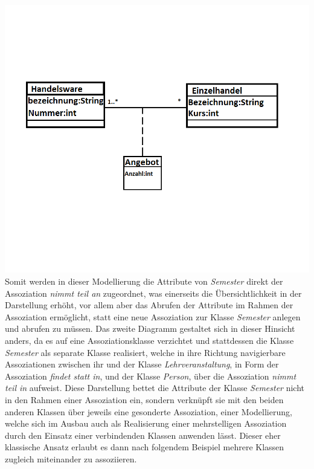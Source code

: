 \documentclass{swp1}
\begin{document}
\newline
\includegraphics[scale=0.5]{Assoziationsklasse}
\newline
Somit werden in dieser Modellierung die Attribute von \emph{Semester} direkt der Assoziation \emph{nimmt teil an} zugeordnet, was einerseits die Übersichtlichkeit in der Darstellung erhöht, vor allem aber das Abrufen der Attribute im Rahmen der Assoziation ermöglicht, statt eine neue Assoziation zur Klasse \emph{Semester} anlegen und abrufen zu müssen.\newline
\newline
Das zweite Diagramm gestaltet sich in dieser Hinsicht anders, da es auf eine Assoziationsklasse verzichtet und stattdessen die Klasse \emph{Semester} als separate Klasse realisiert, welche in ihre Richtung navigierbare Assoziationen zwischen ihr und der Klasse \emph{Lehrveranstaltung}, in Form der Assoziation \emph{findet statt in}, und der Klasse \emph{Person}, über die Assoziation \emph{nimmt teil in} aufweist.\newline
Diese Darstellung bettet die Attribute der Klasse \emph{Semester} nicht in den Rahmen einer Assoziation ein, sondern verknüpft sie mit den beiden anderen Klassen über jeweils eine gesonderte Assoziation, einer Modellierung, welche sich im Ausbau auch als Realisierung einer mehrstelligen Assoziation durch den Einsatz einer verbindenden Klassen anwenden lässt. Dieser eher klassische Ansatz erlaubt es dann nach folgendem Beispiel mehrere Klassen zugleich miteinander zu assoziieren.\newline
\end{document}
